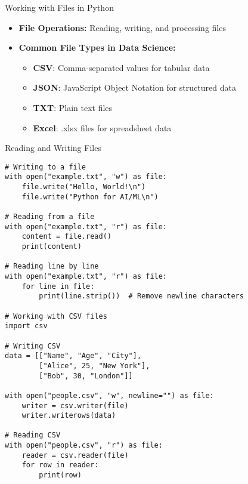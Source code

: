 \begin{frame}{Working with Files in Python}
    \begin{itemize}
        \item \textbf{File Operations:} Reading, writing, and processing files
        \item \textbf{Common File Types in Data Science:}
        \begin{itemize}
            \item \textbf{CSV}: Comma-separated values for tabular data
            \item \textbf{JSON}: JavaScript Object Notation for structured data
            \item \textbf{TXT}: Plain text files
            \item \textbf{Excel}: .xlsx files for spreadsheet data
        \end{itemize}
    \end{itemize}
\end{frame}

\begin{frame}[fragile]{Reading and Writing Files}
    \begin{codeblock}
        \begin{lstlisting}
# Writing to a file
with open("example.txt", "w") as file:
    file.write("Hello, World!\n")
    file.write("Python for AI/ML\n")

# Reading from a file
with open("example.txt", "r") as file:
    content = file.read()
    print(content)

# Reading line by line
with open("example.txt", "r") as file:
    for line in file:
        print(line.strip())  # Remove newline characters

# Working with CSV files
import csv

# Writing CSV
data = [["Name", "Age", "City"],
        ["Alice", 25, "New York"],
        ["Bob", 30, "London"]]

with open("people.csv", "w", newline="") as file:
    writer = csv.writer(file)
    writer.writerows(data)

# Reading CSV
with open("people.csv", "r") as file:
    reader = csv.reader(file)
    for row in reader:
        print(row)
        \end{lstlisting}
    \end{codeblock}
\end{frame}
